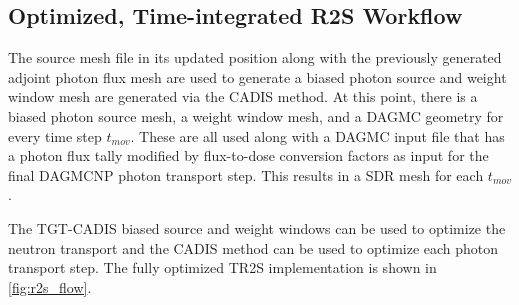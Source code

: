 \subsection{Optimized, Time-integrated R2S Workflow}

The source mesh file in its updated position along with the previously
generated adjoint photon flux mesh are used to generate a biased photon source 
and weight window mesh are generated via the CADIS method.  At this point,
there is a biased photon source mesh, a weight window mesh, and a DAGMC
geometry for every time step $t_{mov}$.  These are all used along with a DAGMC
input file that has a photon flux tally modified by flux-to-dose conversion
factors as input for the final DAGMCNP photon transport step.  This results in
a SDR mesh for each $t_{mov}$.  

The TGT-CADIS biased source and weight windows can be used to optimize the 
neutron transport and the CADIS method can be used to optimize each photon
transport step.  The fully optimized TR2S implementation is shown in \ref{fig:r2s_flow}.

 

